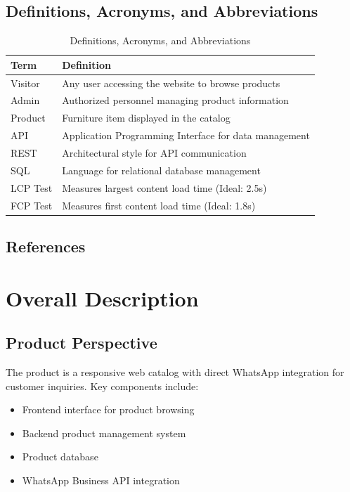 \documentclass[oneside,a4paper,12pt,explicit]{book}
\renewcommand{\arraystretch}{1.2} %
\begin{document}
\section{Definitions, Acronyms, and Abbreviations}
\begin{table}[H]
    \centering
    \renewcommand{\arraystretch}{1.2}
    \begin{tabularx}{\textwidth}{|l|X|}
        \hline
        \textbf{Term} & \textbf{Definition} \\
        \hline
        Visitor & Any user accessing the website to browse products \\
        \hline
        Admin & Authorized personnel managing product information \\
        \hline
        Product & Furniture item displayed in the catalog \\
        \hline
        API & Application Programming Interface for data management\cite{API} \\
        \hline
        REST & Architectural style for API communication\cite{REST} \\
        \hline
        SQL & Language for relational database management\cite{SQL} \\
        \hline
        LCP Test & Measures largest content load time (Ideal: \< 2.5s) \\
        \hline
        FCP Test & Measures first content load time (Ideal: \< 1.8s) \\
        \hline
    \end{tabularx}
    \caption{Definitions, Acronyms, and Abbreviations}
    \label{tab:definitions}
\end{table}

\section{References}
\printbibliography[heading=none]

\chapter{Overall Description}

\section{Product Perspective}
The product is a responsive web catalog with direct WhatsApp integration for customer inquiries. 
Key components include:
\begin{itemize}
    \item Frontend interface for product browsing
    \item Backend product management system
    \item Product database
    \item WhatsApp Business API integration
\end{itemize}
\end{document}
